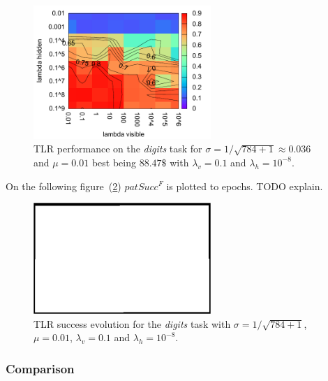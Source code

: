 \begin{figure}[H]
  \centering
  \includegraphics[width=0.60\textwidth]{img/tlr-digits-psf.pdf} 
  \caption{TLR performance on the \emph{digits} task for $\sigma = 1/\sqrt{784+1} \approx 0.036$ and $\mu = 0.01$ best being $88.47\$$ with $\lambda_v=0.1$ and $\lambda_h=10^{-8}$.}
  \label{fig:results-tlr-digits-success}
\end{figure}

On the following figure~(\ref{fig:results-tlr-digits-epoch}) $patSucc^F$ is plotted to epochs. TODO explain. 

\begin{figure}[H]
  \centering
  \includegraphics[width=0.60\textwidth]{img/placeholder.png}  %
  \caption{TLR success evolution for the \emph{digits} task with $\sigma = 1/\sqrt{784+1}$, $\mu = 0.01$, $\lambda_v=0.1$ and $\lambda_h=10^{-8}$.}
  \label{fig:results-tlr-digits-epoch} 
\end{figure}

\subsubsection{Comparison} 
\label{sec:results-cmp-digits} 

